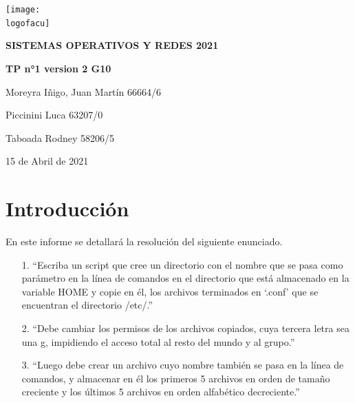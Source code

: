 \documentclass[12pt,a4paper]{article} %
\newcommand{\materia}{SISTEMAS OPERATIVOS Y REDES 2021}
\newcommand{\Date}{15 de Abril de 2021}
\newcommand{\logofacu}{logo-unlp.png}
\begin{document}
	\cfoot{\thepage}
	\begin{titlepage}
	\centering                 
	\texttt{[image: \\logofacu]}\par\vspace{1cm}
	{\scshape\LARGE \textbf{\materia}}\par\vspace{0.2cm}
	{\Huge\bfseries\textcolor{colorfacu}{TP n°1 version 2 G10}}\par\vspace{1cm}
	{\large Moreyra Iñigo, Juan Martín
66664/6}\par\vspace{0.2cm}
	{\large Piccinini Luca 63207/0}\par\vspace{0.2cm}
	{\large Taboada Rodney 58206/5}\par\vspace{0.2cm}
	{\large \Date\par}
	\end{titlepage}
	\clearpage
	\tableofcontents
	\clearpage
	\section{Introducción}
	En este informe se detallará la resolución del siguiente enunciado. 
    \begin{itemize}
    \item[1.] “Escriba un script que cree un directorio con el nombre que se pasa como parámetro en la línea de comandos en el directorio que está almacenado en la variable HOME y copie en él, los archivos terminados en ‘.conf’ que se encuentran el directorio /etc/.”
    \item[2.] “Debe cambiar los permisos de los archivos copiados, cuya tercera letra sea una g, impidiendo el acceso total al resto del mundo y al grupo.”
    \item[3.] “Luego debe crear un archivo cuyo nombre también se pasa en la línea de comandos, y almacenar en él los primeros 5 archivos en orden de tamaño creciente y los últimos 5 archivos en orden alfabético decreciente.”
    \end{itemize}
\end{document}
